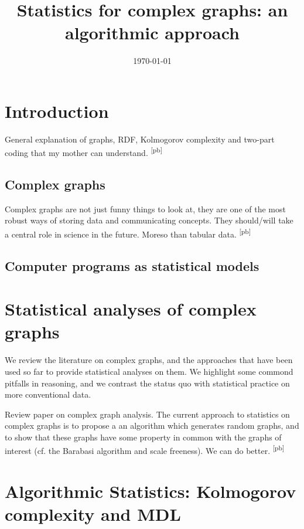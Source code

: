 \documentclass{thesis}
\title{Statistics for complex graphs: an algorithmic approach}
\date{\today}
\newcommand{\pb}[1]{\textcolor{OliveGreen}{\small #1 \textsuperscript{[pb]} }}
\begin{document}
\maketitle

\tableofcontents

\chapter{Introduction}
\pb{General explanation of graphs, RDF, Kolmogorov complexity and two-part coding that my mother can understand.}


\section{Complex graphs}

\pb{Complex graphs are not just funny things to look at, they are one of the most robust ways of storing data and communicating concepts. They should/will take a central role in science in the future. Moreso than tabular data.} 

\section{Computer programs as statistical models}



\chapter{Statistical analyses of complex graphs}

\begin{summary} We review the literature on complex graphs, and the approaches that have been used so far to provide statistical analyses on them. We highlight some commond pitfalls in reasoning, and we contrast the status quo with statistical practice on more conventional data.
\end{summary}

\pb{Review paper on complex graph analysis. The current approach to statistics on complex graphs is to propose a an algorithm which generates random graphs, and to show that these graphs have some property in common with the graphs of interest (cf. the Barabasi algorithm and scale freeness). We can do better.}

\chapter{Algorithmic Statistics: Kolmogorov complexity and MDL}
\end{document}
